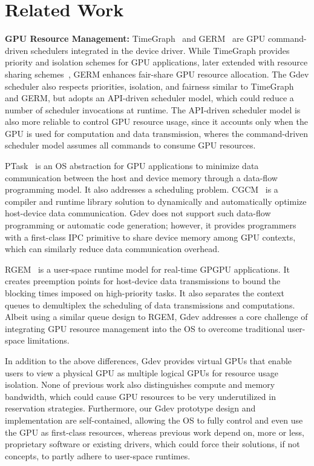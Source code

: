 \vspace{-0.25em}
\section{Related Work}
\label{sec:related_work}
\vspace{-0.25em}

\textbf{GPU Resource Management:}
TimeGraph~\cite{Kato_ATC11} and GERM~\cite{Bautin_MCNC08} are GPU
command-driven schedulers integrated in the device driver.
While TimeGraph provides priority and isolation schemes for
GPU applications, later extended with resource sharing
schemes~\cite{Kato_RTAS11}, GERM enhances fair-share GPU resource
allocation.
The Gdev scheduler also respects priorities, isolation, and fairness
similar to TimeGraph and GERM, but adopts an API-driven scheduler model,
which could reduce a number of scheduler invocations at runtime.
The API-driven scheduler model is also more reliable to control GPU
resource usage, since it accounts only when the GPU is used
for computation and data transmission, wheres the command-driven
scheduler model assumes all commands to consume GPU resources.

PTask~\cite{Rossbach_SOSP11} is an OS abstraction for GPU applications
to minimize data communication between the host and device memory
through a data-flow programming model.
It also addresses a scheduling problem.
CGCM~\cite{Jablin_PLDI11} is a compiler and runtime library solution to
dynamically and automatically optimize host-device data communication.
Gdev does not support such data-flow programming or automatic code
generation; however, it provides programmers with a first-class IPC
primitive to share device memory among GPU contexts, which can similarly
reduce data communication overhead.

RGEM~\cite{Kato_RTSS11} is a user-space runtime model for real-time
GPGPU applications.
It creates preemption points for host-device data transmissions to bound
the blocking times imposed on high-priority tasks.
It also separates the context queues to demultiplex the scheduling of
data transmissions and computations.
Albeit using a similar queue design to RGEM, Gdev addresses a core
challenge of integrating GPU resource management into the OS to overcome
traditional user-space limitations.

In addition to the above differences, Gdev provides virtual GPUs that
enable users to view a physical GPU as multiple logical GPUs for
resource usage isolation.
None of previous work also distinguishes compute and memory bandwidth,
which could cause GPU resources to be very underutilized in
reservation strategies.
Furthermore, our Gdev prototype design and implementation are
self-contained, allowing the OS to fully control and even use the GPU as
first-class resources, whereas previous work depend on, more or less,
proprietary software or existing drivers, which could force their
solutions, if not concepts, to partly adhere to user-space runtimes.

